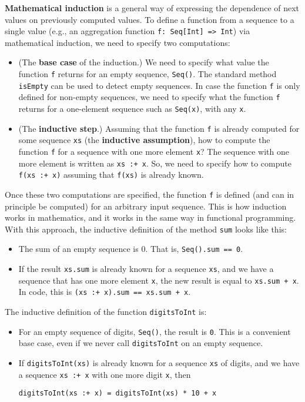 \textbf{Mathematical induction} is
a general way of expressing the dependence of next values on previously
computed values. To define a function from a sequence to a single
value (e.g., an aggregation function \lstinline!f: Seq[Int] => Int!)
via mathematical induction, we need to specify two computations:
\begin{itemize}
\item (\textbf{}The \textbf{base
case} of the induction.) We need to specify what value the function
\lstinline!f! returns for an empty sequence, \lstinline!Seq()!.
The standard method \lstinline!isEmpty! can be used to detect empty
sequences. In case the function \lstinline!f! is only defined for
non-empty sequences, we need to specify what the function \lstinline!f!
returns for a one-element sequence such as \lstinline!Seq(x)!, with
any \lstinline!x!.
\item (\textbf{}The \textbf{inductive
step}.) Assuming that the function \lstinline!f! is already computed
for some sequence \lstinline!xs! (the \textbf{inductive
assumption}), how to compute the function \lstinline!f! for a sequence
with one more element \lstinline!x!? The sequence with one more element
is written as \lstinline!xs :+ x!. So, we need to specify how to
compute \lstinline!f(xs :+ x)! assuming that \lstinline!f(xs)! is
already known.
\end{itemize}
Once these two computations are specified, the function \lstinline!f!
is defined (and can in principle be computed) for an arbitrary input
sequence. This is how induction works in mathematics, and it works
in the same way in functional programming. With this approach, the
inductive definition of the method \lstinline!sum! looks like this:
\begin{itemize}
\item The sum of an empty sequence is $0$. That is, \lstinline!Seq().sum == 0!.
\item If the result \lstinline!xs.sum! is already known for a sequence
\lstinline!xs!, and we have a sequence that has one more element
\lstinline!x!, the new result is equal to \lstinline!xs.sum + x!.
In code, this is \lstinline!(xs :+ x).sum == xs.sum + x!.
\end{itemize}
The inductive definition of the function \lstinline!digitsToInt!
is:
\begin{itemize}
\item For an empty sequence of digits, \lstinline!Seq()!, the result is
\lstinline!0!. This is a convenient base case, even if we never call
\lstinline!digitsToInt! on an empty sequence.
\item If \lstinline!digitsToInt(xs)! is already known for a sequence \lstinline!xs!
of digits, and we have a sequence \lstinline!xs :+ x! with one more
digit \lstinline!x!, then
\begin{lstlisting}
digitsToInt(xs :+ x) = digitsToInt(xs) * 10 + x
\end{lstlisting}
\end{itemize}
